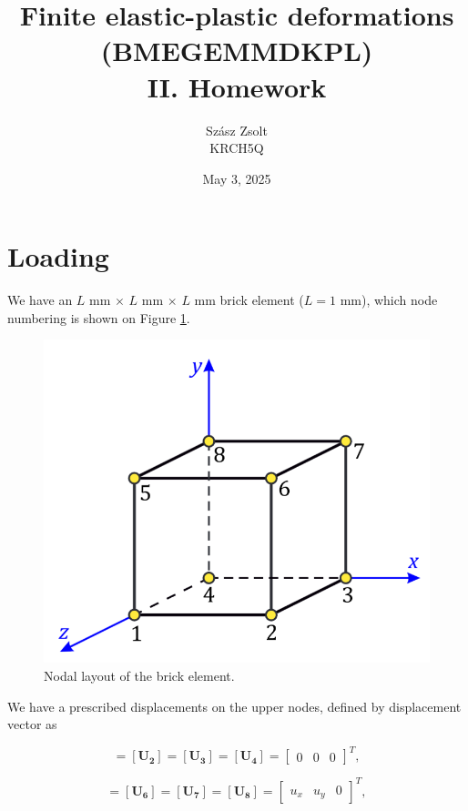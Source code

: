 \documentclass[12pt,a4paper]{article}
\title{Finite elastic-plastic deformations\\(BMEGEMMDKPL)\\II. Homework}
\author{Szász Zsolt\\KRCH5Q}
\date{May 3, 2025}
\begin{document}
\maketitle{}
\newpage

\section*{Loading}

We have  an $L$ mm $\times$ $L$ mm $\times$ $L$ mm brick element ($L=1$ mm), which node numbering is shown on Figure \ref{fig:cube}.

\begin{figure}[h]
    \centering
    \includegraphics[scale=0.4]{figures/cube.png}
    \caption{Nodal layout of the brick element.}
    \label{fig:cube}
\end{figure}

We have a prescribed displacements on the upper nodes, defined by displacement vector as

\begin{equation}
    [\boldsymbol{U_1}] = [\boldsymbol{U_2}] = [\boldsymbol{U_3}] = [\boldsymbol{U_4}] = \begin{bmatrix} 0 & 0 & 0 \end{bmatrix}^T,
\end{equation}

\begin{equation}
    [\boldsymbol{U_5}] = [\boldsymbol{U_6}] = [\boldsymbol{U_7}] = [\boldsymbol{U_8}] = \begin{bmatrix} u_x & u_y & 0 \end{bmatrix}^T,
\end{equation}\\
\end{document}
